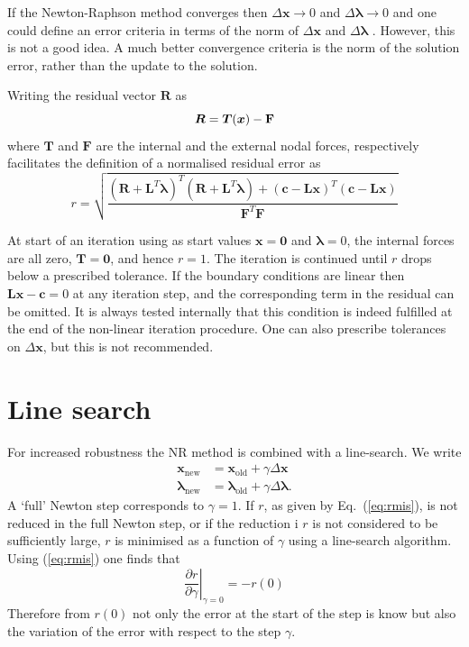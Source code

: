 \documentclass[10pt,a4paper]{book}
\begin{document}
If the Newton-Raphson method converges then $\Delta \bm{x} \to 0$ and  $\Delta \bm{\lambda} \to 0$ and
one could define an error criteria in terms of the norm of
$\Delta \bm{x}$ and $\Delta \bm{\lambda}$ . However, this is not a good idea. A much better
convergence criteria is the norm of the solution error, rather than the
update to the solution.


Writing the residual vector $\bm{R}$  as 
\[
\bm{R}=\bm{T}(\bm{x})-\bf{F}
\]
where $\bm{T}$ and $\bm{F}$ are the internal and the external nodal
forces, respectively facilitates the definition of a normalised
residual error as
\begin{equation}
r=\sqrt{\frac{(\bm{R}+\bm{L}^T \bm{\lambda})^T (\bm{R}+\bm{L}^T \bm{\lambda}) + (\bm{c} -\bm{L} \bm{x})^T (\bm{c} -\bm{L} \bm{x})} {\bm{F}^T \bm{F}}}
\label{eq:rmis}
\end{equation}

At start of an iteration using as start values $\bm{x}=\bm{0}$ and
$\bm{\lambda}=0$, the internal forces are all zero, $\bm{T}=\bm{0}$,
and hence $r=1$. The iteration is continued until $r$ drops below a
prescribed tolerance. If the boundary conditions are linear then
$ \bm{L} \bm{x} - \bm{c} = 0 $ at any iteration step, and the
corresponding term in the residual can be omitted. It is always
tested internally that this condition is indeed fulfilled at the end
of the non-linear iteration procedure. One can also prescribe
tolerances on $\Delta \bm{x}$, but this is not recommended.



\section{Line search}


For increased robustness the  NR method is combined with a line-search. We write
\begin{align*}
\bm{x}_{\mathrm{new}} &=\bm{x}_{\mathrm{old}}+\gamma \Delta \bm{x}\\
\bm{\lambda}_{\mathrm{new}} &=\bm{\lambda}_{\mathrm{old}}+\gamma \Delta \bm{\lambda}.
\end{align*}
A `full' Newton step corresponds to $\gamma=1$. If $r$, as given by
Eq.~(\ref{eq:rmis}), is not reduced in the full Newton step, or if the
reduction i $r$ is not considered to be sufficiently large, $r$ is
minimised as a function of $\gamma$ using a line-search algorithm.
Using (\ref{eq:rmis}) one finds that
\[
\left . \frac{\partial r}{\partial \gamma} \right |_{\gamma=0} = -r(0)
\]
Therefore from $r(0)$ not only the error at the start of the step is
know but also the variation of the error with respect to the step
$\gamma$.
\end{document}
